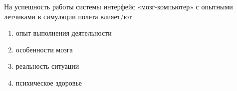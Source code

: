 
На успешность работы системы интерфейс «мозг-компьютер»  с опытными летчиками в симуляции полета влияет/ют

\begin{enumerate}
    \item опыт выполнения деятельности
    \item особенности мозга
    \item реальность ситуации
    \item психическое здоровье
\end{enumerate}